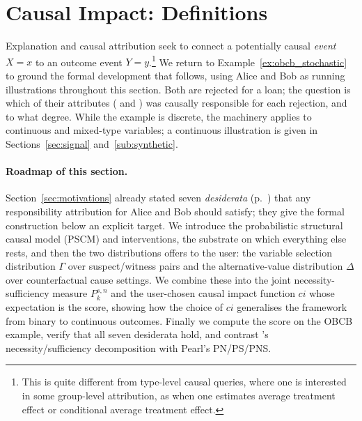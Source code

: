 \section{Causal Impact: Definitions}\label{sec:causal_impact}

Explanation and causal attribution seek to connect a potentially causal \textit{event} $X=x$ to an outcome event $Y=y$.\footnote{This is quite different from type-level causal queries, where one is interested in some group-level attribution, as when one estimates average treatment effect or conditional average treatment effect.}
We return to Example~\ref{ex:obcb_stochastic} to ground the formal development that follows,
 using Alice and Bob as running illustrations throughout this section. Both are rejected for a loan; the question is
 which of their attributes ( and ) was causally responsible for each rejection,
 and to what degree. While the example is discrete, the machinery applies to continuous and mixed-type variables;
  a continuous illustration is given in Sections~\ref{sec:signal} and~\ref{sub:synthetic}.

\paragraph{Roadmap of this section.}
Section~\ref{sec:motivations} already stated seven \emph{desiderata}
(p.~\pageref{desid}) that any responsibility attribution for Alice and Bob
should satisfy; they give the formal construction below an explicit target. We
introduce the probabilistic
structural causal model (PSCM) and interventions, the substrate on which everything
else rests, and then the two distributions \ourapproach offers to the user: the
variable selection distribution $\Gamma$ over suspect/witness pairs and the
alternative-value distribution $\Delta$ over counterfactual cause settings. We combine
these into the joint necessity-sufficiency measure $P_k^{s,n}$ and the user-chosen
causal impact function $ci$ whose expectation is the \ourapproach score, showing how
the choice of $ci$ generalises the framework from binary to continuous outcomes.
Finally we compute the score on the OBCB example, verify that all seven desiderata
hold, and contrast \ourapproach's necessity/sufficiency decomposition with Pearl's
PN/PS/PNS.

